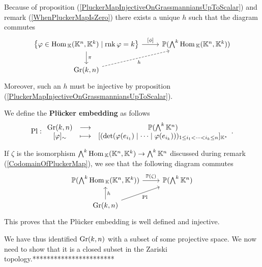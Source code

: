 \begin{remark}
Because of proposition (\ref{PluckerMapInjectiveOnGrassmanniansUpToScalar}) and remark (\ref{WhenPluckerMapIsZero}) there exists a unique $h$ such that the diagram commutes
\[\begin{tikzcd}
	{\cpa{\vp\in \Hom_\K(\K^n,\K^k)\mid \rnk \vp=k}} & {\Pj(\bigwedge^k\Hom_\K(\K^n,\K^k))} \\
	{\Gr(k,n)}
	\arrow["\pi", from=1-1, to=2-1]
	\arrow["{[\phi]}", from=1-1, to=1-2]
	\arrow["h"', dashed, from=2-1, to=1-2]
\end{tikzcd}\]
Moreover, such an $h$ must be injective by proposition (\ref{PluckerMapInjectiveOnGrassmanniansUpToScalar}).
\end{remark}

\begin{definition}
We define the \textbf{Pl\"ucker embedding} as follows
\[\mathrm{Pl}:\begin{array}{ccc} {\mathrm{Gr}(k,n)} & \longrightarrow & {\mathbb{P}(\bigwedge^k\mathbb{K}^n)}\\ {[\varphi]_\sim} & \longmapsto & {[(\det(\varphi(e_{i_1})\mid\cdots\mid\varphi(e_{i_k})))_{1\leq i_1<\cdots<i_k\leq n}]_{\mathbb{K}^\ast}} \end{array}.\]
\end{definition}

\begin{remark}
If $\zeta$ is the isomorphism $\bigwedge^k\mathrm{Hom}\,_{\mathbb{K}}(\mathbb{K}^n,\mathbb{K}^k)\to \bigwedge^k\mathbb{K}^n$ discussed during remark (\ref{CodomainOfPluckerMap}), we see that the following diagram commutes
\[\begin{tikzcd}
	{\Pj(\bigwedge^k\Hom_\K(\K^n,\K^k))} & {\Pj(\bigwedge^k\K^n)} \\
	{\Gr(k,n)}
	\arrow["h"', from=2-1, to=1-1]
	\arrow["{\Pj(\zeta)}", from=1-1, to=1-2]
	\arrow["{\Pl}"', from=2-1, to=1-2]
\end{tikzcd}\]
This proves that the Pl\"ucker embedding is well defined and injective.
\end{remark}

\noindent We have thus identified $\mathrm{Gr}(k,n)$ with a subset of some projective space. We now need to show that it is a closed subset in the Zariski topology.***********************

